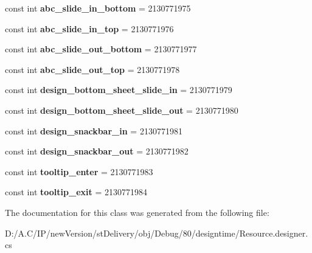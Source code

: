 \begin{DoxyCompactItemize}
const int {\bfseries abc\+\_\+slide\+\_\+in\+\_\+bottom} = 2130771975
\item 
\mbox{\label{classst_delivery_1_1_resource_1_1_animation_a3d9b8ea1a255fcce051346733244e584}} 
const int {\bfseries abc\+\_\+slide\+\_\+in\+\_\+top} = 2130771976
\item 
\mbox{\label{classst_delivery_1_1_resource_1_1_animation_ab37df19b5430e821d4e3fa26b95a162f}} 
const int {\bfseries abc\+\_\+slide\+\_\+out\+\_\+bottom} = 2130771977
\item 
\mbox{\label{classst_delivery_1_1_resource_1_1_animation_ae340cdab01b3dd8581ab2ad9ff83e348}} 
const int {\bfseries abc\+\_\+slide\+\_\+out\+\_\+top} = 2130771978
\item 
\mbox{\label{classst_delivery_1_1_resource_1_1_animation_a10d0dd563fb04d23322b0414f02b1369}} 
const int {\bfseries design\+\_\+bottom\+\_\+sheet\+\_\+slide\+\_\+in} = 2130771979
\item 
\mbox{\label{classst_delivery_1_1_resource_1_1_animation_a8893a48050887b13bd43ee078dda4219}} 
const int {\bfseries design\+\_\+bottom\+\_\+sheet\+\_\+slide\+\_\+out} = 2130771980
\item 
\mbox{\label{classst_delivery_1_1_resource_1_1_animation_ad7ebc77c2e1475bfc9367b8a55d58562}} 
const int {\bfseries design\+\_\+snackbar\+\_\+in} = 2130771981
\item 
\mbox{\label{classst_delivery_1_1_resource_1_1_animation_a510e2c38a18e64dbbefdc85503a9744a}} 
const int {\bfseries design\+\_\+snackbar\+\_\+out} = 2130771982
\item 
\mbox{\label{classst_delivery_1_1_resource_1_1_animation_adfa8a4cd40688bbe6f6ec65cade781cb}} 
const int {\bfseries tooltip\+\_\+enter} = 2130771983
\item 
\mbox{\label{classst_delivery_1_1_resource_1_1_animation_a367b15d09a385410ef7d1a2db3bf080d}} 
const int {\bfseries tooltip\+\_\+exit} = 2130771984
\end{DoxyCompactItemize}


The documentation for this class was generated from the following file\+:\begin{DoxyCompactItemize}
\item 
D\+:/\+A.\+C/\+I\+P/new\+Version/st\+Delivery/obj/\+Debug/80/designtime/Resource.\+designer.\+cs\end{DoxyCompactItemize}
